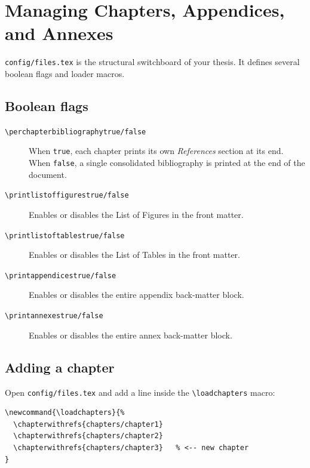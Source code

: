 \section{Managing Chapters, Appendices, and Annexes} \label{sec:files}

\texttt{config/files.tex} is the structural switchboard of your thesis.
It defines several boolean flags and loader macros.

\subsection{Boolean flags} \label{sec:flags}

\begin{description}
  \item[\texttt{\textbackslash perchapterbibliographytrue/false}]
        When \texttt{true}, each chapter prints its own \emph{References}
        section at its end.  When \texttt{false}, a single consolidated
        bibliography is printed at the end of the document.

  \item[\texttt{\textbackslash printlistoffigurestrue/false}]
        Enables or disables the List of Figures in the front matter.

  \item[\texttt{\textbackslash printlistoftablestrue/false}]
        Enables or disables the List of Tables in the front matter.

  \item[\texttt{\textbackslash printappendicestrue/false}]
        Enables or disables the entire appendix back-matter block.

  \item[\texttt{\textbackslash printannexestrue/false}]
        Enables or disables the entire annex back-matter block.
\end{description}

\subsection{Adding a chapter} \label{sec:addchapter}

Open \texttt{config/files.tex} and add a line inside the
\texttt{\textbackslash loadchapters} macro:

\begin{verbatim}
\newcommand{\loadchapters}{%
  \chapterwithrefs{chapters/chapter1}
  \chapterwithrefs{chapters/chapter2}
  \chapterwithrefs{chapters/chapter3}   % <-- new chapter
}
\end{verbatim}

